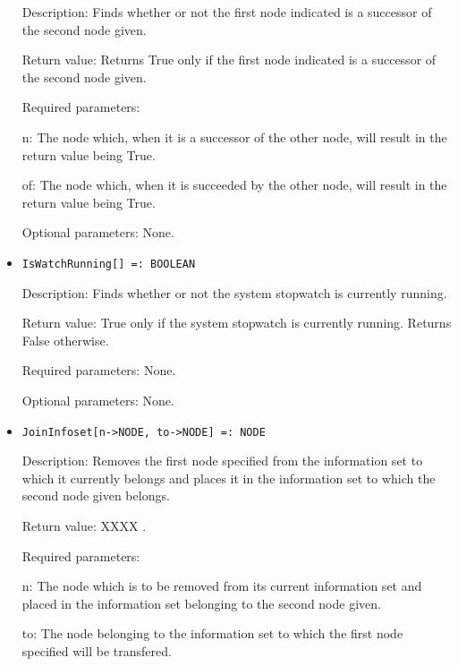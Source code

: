 \begin{itemize}
\bd
\item
[Description:] Finds whether or not the first node indicated is a
successor of the second node given.
\item
[Return value:] Returns True only if the first node indicated is a
successor of the second node given.
\item
[Required parameters:]\hfil\null
	
\bd
\item
[n:] The node which, when it is a successor of the other node, will
result in the return value being True.
\item
[of:] The node which, when it is succeeded by the other node, will
result in the return value being True.
\ed

\item
[Optional parameters:] None.
\ed

\item
\protect \large \begin{verbatim}
IsWatchRunning[] =: BOOLEAN
\end{verbatim}\normalsize

\bd
\item
[Description:] Finds whether or not the system stopwatch is currently
running.
\item
[Return value:] True only if the system stopwatch is currently
running.  Returns False otherwise.
\item
[Required parameters:] None.
\item
[Optional parameters:] None.
\ed

\item
\protect \large \begin{verbatim}
JoinInfoset[n->NODE, to->NODE] =: NODE
\end{verbatim}\normalsize

\bd
\item
[Description:] Removes the first node specified from the information
set to which it currently belongs and places it in the information set
to which the second node given belongs.
\item
[Return value:] XXXX .
\item
[Required parameters:]\hfil\null
	  
\bd
\item
[n:] The node which is to be removed from its current information set
and placed in the information set belonging to the second node given.
\item
[to:] The node belonging to the information set to which the first
node specified will be transfered.
\ed


\end{itemize}
